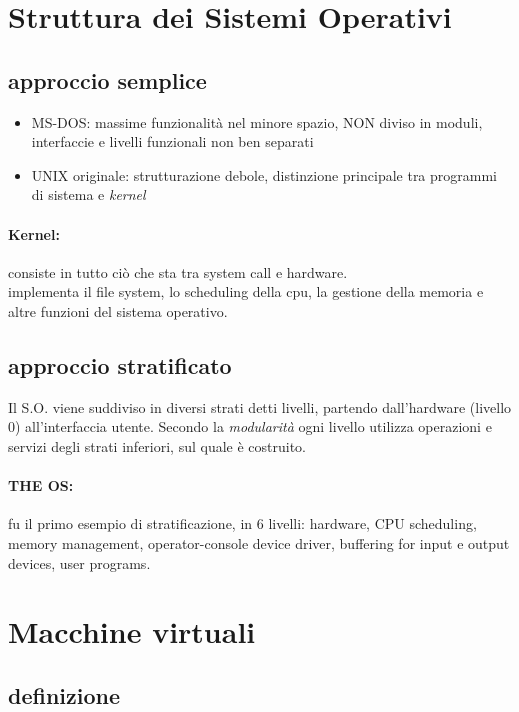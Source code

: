 \documentclass{article}
\begin{document}
\section{Struttura dei Sistemi Operativi}
\subsection{approccio semplice}
\begin{itemize}
    \item MS-DOS: massime funzionalità nel minore spazio, NON diviso in moduli, interfaccie e livelli funzionali non ben separati
    \item UNIX originale: strutturazione debole, distinzione principale tra programmi di sistema e \textit{kernel}
\end{itemize}

\paragraph{Kernel:} consiste in tutto ciò che sta tra system call e hardware. \\
implementa il file system, lo scheduling della cpu, la gestione della memoria e altre funzioni del sistema operativo.

\subsection{approccio stratificato}
Il S.O. viene suddiviso in diversi strati detti livelli, partendo dall'hardware (livello 0) 
all'interfaccia utente. Secondo la \textit{modularità} ogni livello utilizza operazioni e servizi degli strati inferiori, sul quale è costruito.

\paragraph{THE OS:} fu il primo esempio di stratificazione, in 6 livelli: hardware, CPU scheduling, memory management, operator-console device driver,
buffering for input e output devices, user programs.


\section{Macchine virtuali}
\subsection{definizione}
\end{document}
